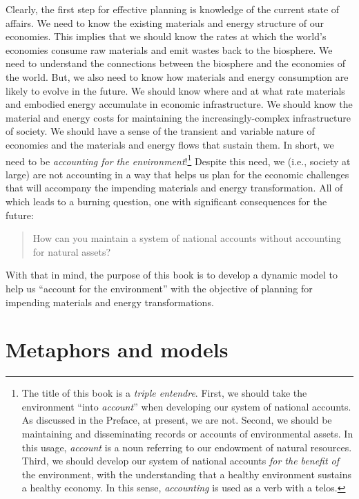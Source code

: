Clearly, the first step for effective planning 
is knowledge of the current state of affairs.
We need to know the existing materials and energy structure of our economies. 
This implies that we should know the rates at which 
the world's economies consume raw materials and emit wastes back to the biosphere.
We need to understand the connections between the biosphere and the economies of the world.
But, we also need to know how materials and energy consumption 
are likely to evolve in the future.
We should know where and at what rate 
materials and embodied energy accumulate 
in economic infrastructure. 
We should know the material and energy costs for maintaining the
increasingly-complex infrastructure of society.
We should have a sense of the transient and variable nature of economies
and the materials and energy flows that sustain them.
In short, we need to be \emph{accounting for the environment}!\footnote{The title 
	of this book is a \emph{triple entendre}.
	First, we should take the environment ``into \emph{account}''
		when developing our system of national accounts.
		As discussed in the Preface, at present, we are not.
	Second, we should be maintaining and disseminating
		records or accounts of environmental assets. 
		In this usage, \emph{account} is a noun
		referring to our endowment of natural resources.
	Third, we should develop our system of national accounts 
		\emph{for the benefit of} the environment, 
		with the understanding 
		that a healthy environment sustains a healthy economy.
		In this sense, \emph{accounting} is used as a verb with a telos.
}
Despite this need, we (i.e., society at large) 
are not accounting in a way that helps us plan 
for the economic challenges that will accompany 
the impending materials and energy transformation.
All of which leads to a burning question,
one with significant consequences for the future:

\begin{quote}
{\normalsize{How can you maintain a system of national accounts without 
accounting for natural assets?}}
\end{quote}

\noindent{}With that in mind, the purpose of this book is to 
develop a dynamic model to help us
``account for the environment''
with the objective of planning for impending materials and energy transformations.

\section{Metaphors and models}
\label{sec:metaphors_and_models}

